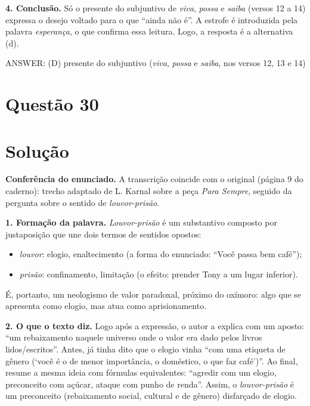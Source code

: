 \documentclass{article}%
\begin{document}
\textbf{4. Conclusão.} Só o presente do subjuntivo de \emph{viva}, \emph{possa} e \emph{saiba} (versos 12 a 14) expressa o desejo voltado para o que ``ainda não é''. A estrofe é introduzida pela palavra \emph{esperança}, o que confirma essa leitura. Logo, a resposta é a alternativa (d).

ANSWER: (D) presente do subjuntivo (\emph{viva}, \emph{possa} e \emph{saiba}, nos versos 12, 13 e 14)%
\newpage%
\section*{Questão 30}

\section*{Solução}

\textbf{Conferência do enunciado.} A transcrição coincide com o original (página 9 do caderno): trecho adaptado de L. Karnal sobre a peça \emph{Para Sempre}, seguido da pergunta sobre o sentido de \emph{louvor-prisão}.

\textbf{1. Formação da palavra.} \emph{Louvor-prisão} é um substantivo composto por justaposição que une dois termos de sentidos opostos:
\begin{itemize}
  \item \emph{louvor}: elogio, enaltecimento (a forma do enunciado: ``Você passa bem café'');
  \item \emph{prisão}: confinamento, limitação (o efeito: prender Tony a um lugar inferior).
\end{itemize}
É, portanto, um neologismo de valor paradoxal, próximo do oxímoro: algo que se apresenta como elogio, mas atua como aprisionamento.

\textbf{2. O que o texto diz.} Logo após a expressão, o autor a explica com um aposto: ``um rebaixamento naquele universo onde o valor era dado pelos livros lidos/escritos''. Antes, já tinha dito que o elogio vinha ``com uma etiqueta de gênero (`você é o de menor importância, o doméstico, o que faz café')''. Ao final, resume a mesma ideia com fórmulas equivalentes: ``agredir com um elogio, preconceito com açúcar, ataque com punho de renda''. Assim, o \emph{louvor-prisão} é um preconceito (rebaixamento social, cultural e de gênero) disfarçado de elogio.
\end{document}
